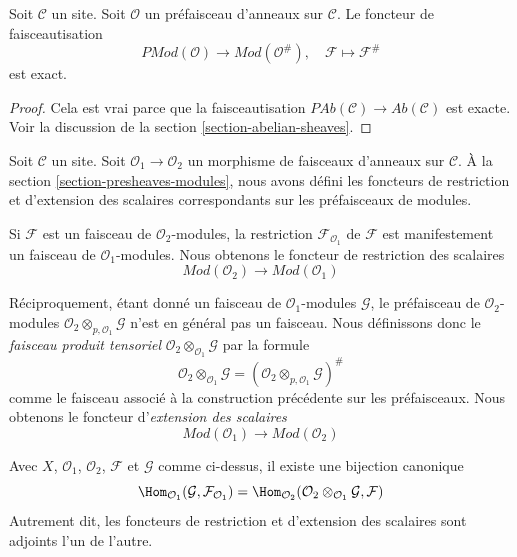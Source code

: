 \begin{lemma}
\label{lemma-sheafification-exact}
Soit $\mathcal{C}$ un site. Soit $\mathcal{O}$ un préfaisceau d'anneaux sur
$\mathcal{C}$. Le foncteur de faisceautisation
$$
\textit{PMod}(\mathcal{O}) \longrightarrow \textit{Mod}(\mathcal{O}^\#), \quad
\mathcal{F} \longmapsto \mathcal{F}^\#
$$
est exact.
\end{lemma}

\begin{proof}
Cela est vrai parce que la faisceautisation
$\textit{PAb}(\mathcal{C}) \to \textit{Ab}(\mathcal{C})$ est exacte. Voir la
discussion de la section \ref{section-abelian-sheaves}.
\end{proof}

\noindent
Soit $\mathcal{C}$ un site. Soit
$\mathcal{O}_1 \to \mathcal{O}_2$ un morphisme de faisceaux d'anneaux sur
$\mathcal{C}$. À la section \ref{section-presheaves-modules}, nous avons défini
les foncteurs de restriction et d'extension des scalaires correspondants sur
les préfaisceaux de modules.

\medskip\noindent
Si $\mathcal{F}$ est un faisceau de $\mathcal{O}_2$-modules, la restriction
$\mathcal{F}_{\mathcal{O}_1}$ de $\mathcal{F}$ est manifestement un faisceau de
$\mathcal{O}_1$-modules. Nous obtenons le foncteur de restriction des scalaires
$$
\textit{Mod}(\mathcal{O}_2)
\longrightarrow
\textit{Mod}(\mathcal{O}_1)
$$

\medskip\noindent
Réciproquement, étant donné un faisceau de $\mathcal{O}_1$-modules
$\mathcal{G}$, le préfaisceau de $\mathcal{O}_2$-modules
$\mathcal{O}_2 \otimes_{p, \mathcal{O}_1} \mathcal{G}$
n'est en général pas un faisceau. Nous définissons donc le {\it faisceau produit
tensoriel}
$\mathcal{O}_2 \otimes_{\mathcal{O}_1} \mathcal{G}$
par la formule
$$
\mathcal{O}_2 \otimes_{\mathcal{O}_1} \mathcal{G}
=
(\mathcal{O}_2 \otimes_{p, \mathcal{O}_1} \mathcal{G})^\#
$$
comme le faisceau associé à la construction précédente sur les préfaisceaux.
Nous obtenons le foncteur d'{\it extension des scalaires}
$$
\textit{Mod}(\mathcal{O}_1)
\longrightarrow
\textit{Mod}(\mathcal{O}_2)
$$

\begin{lemma}
\label{lemma-adjointness-tensor-restrict}
Avec $X$, $\mathcal{O}_1$, $\mathcal{O}_2$, $\mathcal{F}$ et $\mathcal{G}$
comme ci-dessus, il existe une bijection canonique
$$
\Hom_{\mathcal{O}_1}(\mathcal{G}, \mathcal{F}_{\mathcal{O}_1})
=
\Hom_{\mathcal{O}_2}(
\mathcal{O}_2 \otimes_{\mathcal{O}_1} \mathcal{G},
\mathcal{F}
)
$$
Autrement dit, les foncteurs de restriction et d'extension des scalaires sont
adjoints l'un de l'autre.
\end{lemma}

